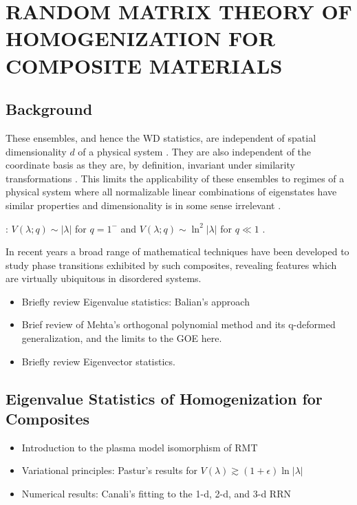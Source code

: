 \documentclass[english,12pt]{ttuthes}
\begin{document}
\chapter{RANDOM MATRIX THEORY OF HOMOGENIZATION
             FOR COMPOSITE MATERIALS}
\label{ch:RMT_of_Composites}
%
\section{Background}
\label{sec:RMT_Background}
These ensembles, and hence 
the WD statistics, are independent of spatial dimensionality $d$ of a
physical system \cite{Canali}. They are also independent of the
coordinate basis as they are, by definition, invariant under
similarity transformations \cite{Mehta:2004:RMT}. This limits the applicability of these
ensembles to regimes of a physical system where all normalizable
linear combinations of eigenstates have similar properties and
dimensionality is in some sense irrelevant \cite{Canali}.

: $V(\lambda;q)\sim|\lambda|$ for $q=1^-$ and
$V(\lambda;q)\sim\ln^2|\lambda|$  for $q\ll1$ \cite{Muttalib_etal_qRME}.


In recent years a broad
range of mathematical techniques have been developed to study phase
transitions exhibited by such composites, revealing features which
are virtually ubiquitous in disordered systems.

%
\begin{itemize}
\item Briefly review Eigenvalue statistics: Balian's approach  
\item Brief review of Mehta's orthogonal polynomial method and its
q-deformed generalization, and the limits to the GOE here.
\item Briefly review Eigenvector statistics.
\end{itemize}

%
\section{Eigenvalue Statistics of Homogenization for Composites}
\label{sec:Eval_Stats_of_Composites}
%
\begin{itemize}
\item Introduction to the plasma model isomorphism of RMT
\item Variational principles: Pastur's results for $V(\lambda)\gtrsim(1+\epsilon)\ln|\lambda|$
\item Numerical results: Canali's fitting to the 1-d, 2-d, and 3-d RRN
\end{itemize}
%
\end{document}
